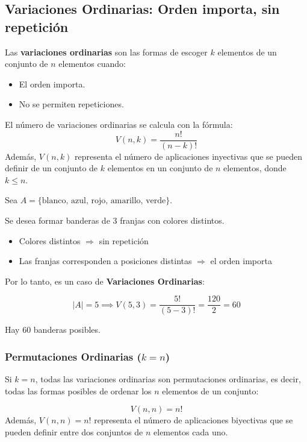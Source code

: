 \documentclass[a4paper,12pt]{article}
\begin{document}
\subsection{Variaciones Ordinarias: Orden importa, sin repetición}

\begin{procedimiento}[title=Definición de variaciones ordinarias]
Las \textbf{variaciones ordinarias} son las formas de escoger $k$ elementos de un conjunto de $n$ elementos cuando:

\begin{itemize}
    \item El orden importa.
    \item No se permiten repeticiones.
\end{itemize}

El número de variaciones ordinarias se calcula con la fórmula:
\[
V(n,k) = \frac{n!}{(n-k)!}
\]
Además, $V(n,k)$ representa el número de aplicaciones inyectivas que se pueden definir de un conjunto de $k$ elementos en un conjunto de $n$ elementos, donde $k \le n$.
\end{procedimiento}

\begin{ejemplo}[title=Ejemplo: Banderas de 3 franjas]
Sea $A = \{\text{blanco, azul, rojo, amarillo, verde}\}$.  

Se desea formar banderas de 3 franjas con colores distintos.  

\begin{itemize}
    \item Colores distintos $\Rightarrow$ sin repetición
    \item Las franjas corresponden a posiciones distintas $\Rightarrow$ el orden importa
\end{itemize}

Por lo tanto, es un caso de \textbf{Variaciones Ordinarias}:

\[
|A| = 5 \implies V(5,3) = \frac{5!}{(5-3)!} = \frac{120}{2} = 60
\]

Hay 60 banderas posibles.
\end{ejemplo}

\subsubsection{Permutaciones Ordinarias ($k=n$)}

\begin{procedimiento}[title=Permutaciones]
Si $k = n$, todas las variaciones ordinarias son permutaciones ordinarias, es decir, todas las formas posibles de ordenar los $n$ elementos de un conjunto:

\[
V(n,n) = n!
\]
Además, $V(n,n) = n!$ representa el número de aplicaciones biyectivas que se pueden definir entre dos conjuntos de $n$ elementos cada uno.
\end{procedimiento}
\end{document}
